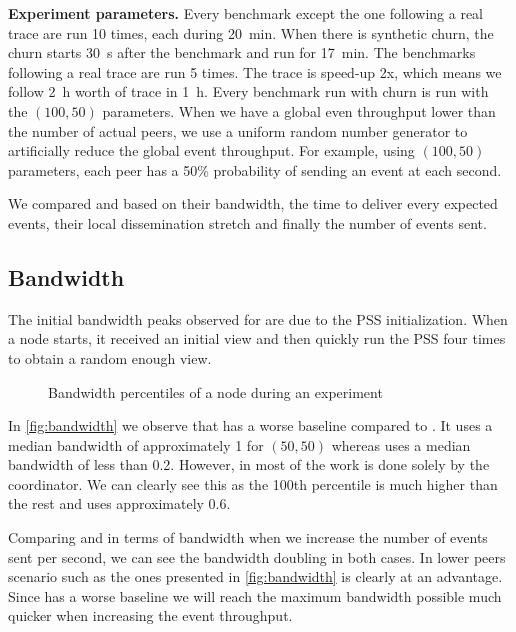 \textbf{Experiment parameters.} Every benchmark except the one following a real trace are run 10 times, each during \SI{20}{\minute}. When there is synthetic churn, the churn starts \SI{30}{\second} after the benchmark and run for \SI{17}{\minute}. The benchmarks following a real trace are run 5 times. The trace is speed-up 2x, which means we follow \SI{2}{\hour} worth of trace in \SI{1}{\hour}. Every benchmark run with churn is run with the $(100,50)$ parameters. When we have a global even throughput lower than the number of actual peers, we use a uniform random number generator to artificially reduce the global event throughput. For example, using $(100,50)$ parameters, each peer has a 50\% probability of sending an event at each second.
\par
We compared \epto and \jgroups based on their bandwidth, the time to deliver every expected events, their local dissemination stretch and finally the number of events sent.
\subsection{Bandwidth}
The initial bandwidth peaks observed for \epto are due to the PSS initialization. When a node starts, it received an initial view and then quickly run the PSS four times to obtain a random enough view.
\begin{figure}[hpt]
	\centering
	
	\vspace{-2mm} 
	\caption{Bandwidth percentiles of a node during an experiment}
	\vspace{-2mm} 
	\label{fig:bandwidth}
\end{figure}
In \autoref{fig:bandwidth} we observe that \epto has a worse baseline compared to \jgroups. It uses a median bandwidth of approximately \SI{1}{\mbps} for $(50,50)$ whereas \jgroups uses a median bandwidth of less than \SI{0.2}{\mbps}. However, in \jgroups most of the work is done solely by the coordinator. We can clearly see this as the 100th percentile is much higher than the rest and uses approximately \SI{.6}{\mbps}.

Comparing \epto and \jgroups in terms of bandwidth when we increase the number of events sent per second, we can see the bandwidth doubling in both cases. In lower peers scenario such as the ones presented in \autoref{fig:bandwidth} \jgroups is clearly at an advantage. Since \epto has a worse baseline we will reach the maximum bandwidth possible much quicker when increasing the event throughput.

